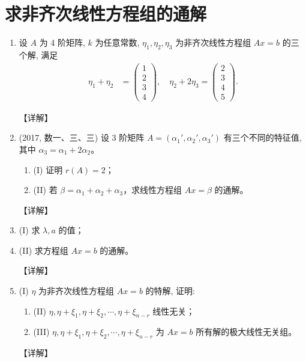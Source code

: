 \documentclass[12pt, a4paper, oneside, UTF8]{ctexbook}
\begin{document}
\section{求非齐次线性方程组的通解}

\begin{enumerate}[label=\arabic*.,start=5]
    \item 设 $A$ 为 4 阶矩阵, $k$ 为任意常数, $\eta_1, \eta_2, \eta_3$ 为非齐次线性方程组 $Ax = b$ 的三个解, 满足
    \begin{align*}
    \eta_1 + \eta_2 &= \begin{pmatrix} 1 \\ 2 \\ 3 \\ 4 \end{pmatrix}, \quad \eta_2 + 2\eta_3 = \begin{pmatrix} 2 \\ 3 \\ 4 \\ 5 \end{pmatrix}.
    \end{align*}
    
    \begin{solution}
    【详解】
    \end{solution}
    
    \item (2017, 数一、三、三) 设 3 阶矩阵 $A = (\alpha_1', \alpha_2', \alpha_3')$ 有三个不同的特征值, 其中 $\alpha_3 = \alpha_1 + 2\alpha_2$。
    \begin{enumerate}
        \item (I) 证明 $r(A) = 2$；
        \item (II) 若 $\beta = \alpha_1 + \alpha_2 + \alpha_3$，求线性方程组 $Ax = \beta$ 的通解。
    \end{enumerate}
    
    \begin{solution}
    【详解】
    \end{solution}
    
    \item (I) 求 $\lambda, a$ 的值；
    \item (II) 求方程组 $Ax = b$ 的通解。
    
    \begin{solution}
    【详解】
    \end{solution}
    
    \item (I) $\eta$ 为非齐次线性方程组 $Ax = b$ 的特解, 证明:
    \begin{enumerate}
        \item (II) $\eta, \eta + \xi_1, \eta + \xi_2, \cdots, \eta + \xi_{n-r}$ 线性无关；
        \item (III) $\eta, \eta + \xi_1, \eta + \xi_2, \cdots, \eta + \xi_{n-r}$ 为 $Ax = b$ 所有解的极大线性无关组。
    \end{enumerate}
    
    \begin{solution}
    【详解】
    \end{solution}
\end{enumerate}
\end{document}
